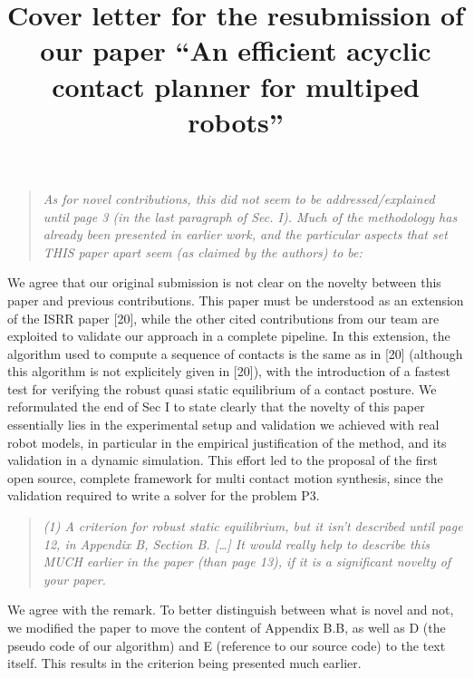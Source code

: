\documentclass[a4paper]{article}
\author {}
\title {Cover letter for the resubmission of our paper ``An efficient acyclic contact planner for multiped robots''}
\date {}
\begin{document}
\maketitle


\begin{quote}
  \textit{As for novel contributions, this did not seem to be addressed/explained
until page 3 (in the last paragraph of Sec. I). Much of the methodology
has already been presented in earlier work, and the particular aspects
that set THIS paper apart seem (as claimed by the authors) to be: 
}
\end{quote}

We agree that our original submission is not clear on the novelty between this paper and previous contributions.
This paper must be understood as an extension of the ISRR paper [20], while the other cited contributions from our team 
are exploited to validate our approach in a complete pipeline.
In this extension, the algorithm used to compute a sequence of contacts is the same as in [20] (although this
algorithm is not explicitely given in [20]), with the introduction of a fastest test for verifying the robust quasi static equilibrium of a contact posture.
We reformulated the end of Sec I to state clearly that the novelty of this paper essentially lies in the experimental setup and validation we achieved with real robot models, in particular
in the empirical justification of the method, and its validation in a dynamic simulation. This effort led to the proposal of the first open source, complete framework for multi contact motion synthesis, since 
the validation required to write a solver for the problem P3. 

\begin{quote}  \textit{ (1) A criterion for robust static equilibrium, but it isn't
described until page 12, in Appendix B, Section B. [\dots]  It would really help to describe this MUCH earlier in
the paper (than page 13), if it is a significant novelty of your paper.}
\end{quote}

We agree with the remark. To better distinguish between what is novel and not, we modified the paper to move the content of Appendix B.B, as well as D  (the pseudo code of our algorithm) and E (reference to our source code) to the text itself. This results in the criterion being presented much earlier.
\end{document}

